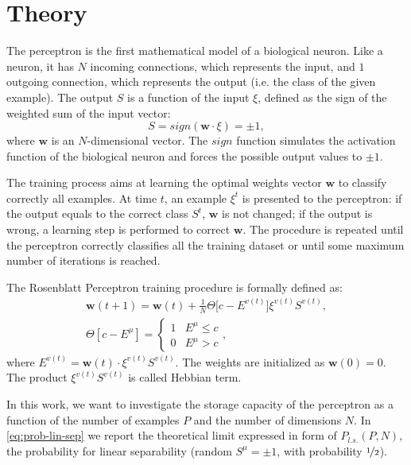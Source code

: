 \section{Theory}
\label{sec:fundamentals}

The perceptron is the first mathematical model of a biological neuron.
Like a neuron, it has $N$ incoming connections, which represents the input, and $1$ outgoing connection, which represents the output (i.e. the class of the given example).
The output $S$ is a function of the input $\xi$, defined as the sign of the weighted sum of the input vector:
\begin{equation}
    S = sign(\mathsf{\bm{w}} \cdotp \xi) = \pm 1,
    \label{eq:perceptron-activation}
\end{equation}
where $\mathsf{\bm{w}}$ is an $N$-dimensional vector.
The $sign$ function simulates the activation function of the biological neuron and forces the possible output values to $\pm 1$.

The training process aims at learning the optimal weights vector $\mathsf{\bm{w}}$ to classify correctly all examples.
At time $t$, an example $\xi^t$ is presented to the perceptron:
if the output equals to the correct class $S^t$, $\mathsf{\bm{w}}$ is not changed;
if the output is wrong, a learning step is performed to correct $\mathsf{\bm{w}}$.
The procedure is repeated until the perceptron correctly classifies all the training dataset or until some maximum number of iterations is reached.

The Rosenblatt Perceptron training procedure is formally defined as:
\begin{gather}
    \label{eq:perceptron-weight-update}
    \mathsf{\bm{w}}(t+1) = \mathsf{\bm{w}}(t) + \frac{1}{N} \Theta \big[c - E^{v(t)}\big] \xi^{v(t)} S^{v(t)}, \\
    \Theta[c - E^{\mu}] =  \begin{cases} \label{eq:heaviside-fun}
        1 & E^{\mu} \leq c \\
        0 & E^{\mu} > c
    \end{cases},
\end{gather}
where $E^{v(t)} = \mathsf{\bm{w}}(t) \cdot \xi^{v(t)} S^{v(t)}$.
The weights are initialized as $\mathsf{\bm{w}}(0) = 0$.
The product $\xi^{v(t)} S^{v(t)}$ is called Hebbian term.

In this work, we want to investigate the storage capacity of the perceptron as a function of the number of examples $P$ and the number of dimensions $N$.
In \cref{eq:prob-lin-sep} we report the theoretical limit expressed in form of $P_{l.s.}(P,N)$, the probability for linear separability (random $S^\mu = \pm 1$, with probability $\nicefrac{1}{2}$).

